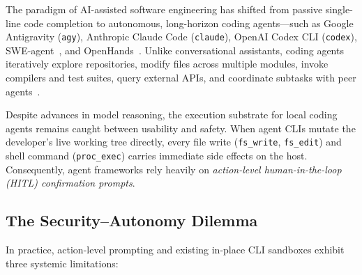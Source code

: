 \documentclass[10pt,twocolumn]{article}
\begin{document}
The paradigm of AI-assisted software engineering has shifted from passive single-line code completion to autonomous, long-horizon coding agents---such as Google Antigravity (\texttt{agy}), Anthropic Claude Code (\texttt{claude}), OpenAI Codex CLI (\texttt{codex}), SWE-agent~\cite{yang2024sweagent}, and OpenHands~\cite{wang2025openhands}. Unlike conversational assistants, coding agents iteratively explore repositories, modify files across multiple modules, invoke compilers and test suites, query external APIs, and coordinate subtasks with peer agents~\cite{jimenez2024swebench,anthropic2024mcp}.

Despite advances in model reasoning, the execution substrate for local coding agents remains caught between usability and safety. When agent CLIs mutate the developer's live working tree directly, every file write (\texttt{fs\_write}, \texttt{fs\_edit}) and shell command (\texttt{proc\_exec}) carries immediate side effects on the host. Consequently, agent frameworks rely heavily on \emph{action-level human-in-the-loop (HITL) confirmation prompts}.

\subsection{The Security--Autonomy Dilemma}

In practice, action-level prompting and existing in-place CLI sandboxes exhibit three systemic limitations:
\end{document}
